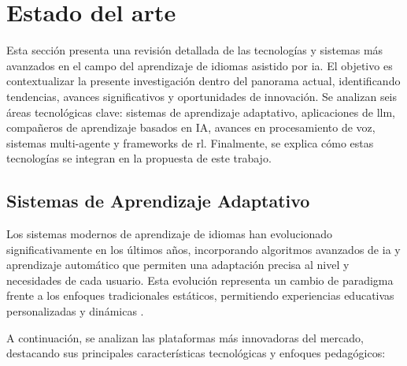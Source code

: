 \chapter{Estado del arte}
\label{estado-del-arte}

Esta sección presenta una revisión detallada de las tecnologías y sistemas más avanzados en el campo del aprendizaje de idiomas asistido por \gls{ia}. El objetivo es contextualizar la presente investigación dentro del panorama actual, identificando tendencias, avances significativos y oportunidades de innovación. Se analizan seis áreas tecnológicas clave: sistemas de aprendizaje adaptativo, aplicaciones de \gls{llm}, compañeros de aprendizaje basados en IA, avances en procesamiento de voz, sistemas multi-agente y frameworks de \gls{rl}. Finalmente, se explica cómo estas tecnologías se integran en la propuesta de este trabajo.

\section{Sistemas de Aprendizaje Adaptativo}
\label{sec:sistemas-aprendizaje-adaptativo}


Los sistemas modernos de aprendizaje de idiomas han evolucionado significativamente en los últimos años, incorporando algoritmos avanzados de \gls{ia} y aprendizaje automático que permiten una adaptación precisa al nivel y necesidades de cada usuario. Esta evolución representa un cambio de paradigma frente a los enfoques tradicionales estáticos, permitiendo experiencias educativas personalizadas y dinámicas \cite{roll2018learning}.

A continuación, se analizan las plataformas más innovadoras del mercado, destacando sus principales características tecnológicas y enfoques pedagógicos:


